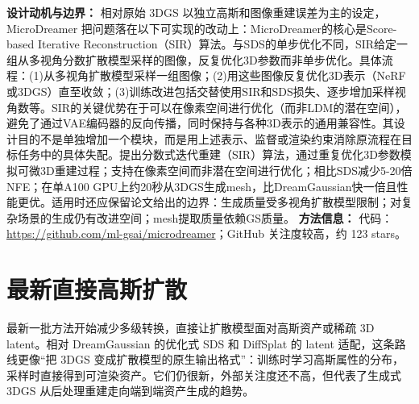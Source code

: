 \textbf{设计动机与边界：} 相对原始 3DGS 以独立高斯和图像重建误差为主的设定，MicroDreamer 把问题落在以下可实现的改动上：MicroDreamer的核心是Score-based Iterative Reconstruction（SIR）算法。与SDS的单步优化不同，SIR给定一组从多视角分数扩散模型采样的图像，反复优化3D参数而非单步优化。具体流程：(1)从多视角扩散模型采样一组图像；(2)用这些图像反复优化3D表示（NeRF或3DGS）直至收敛；(3)训练改进包括交替使用SIR和SDS损失、逐步增加采样视角数等。SIR的关键优势在于可以在像素空间进行优化（而非LDM的潜在空间），避免了通过VAE编码器的反向传播，同时保持与各种3D表示的通用兼容性。其设计目的不是单独增加一个模块，而是用上述表示、监督或渲染约束消除原流程在目标任务中的具体失配。提出分数式迭代重建（SIR）算法，通过重复优化3D参数模拟可微3D重建过程；支持在像素空间而非潜在空间进行优化；相比SDS减少5-20倍NFE；在单A100 GPU上约20秒从3DGS生成mesh，比DreamGaussian快一倍且性能更优。适用时还应保留论文给出的边界：生成质量受多视角扩散模型限制；对复杂场景的生成仍有改进空间；mesh提取质量依赖GS质量。
\textbf{方法信息：} 代码：\url{https://github.com/ml-gsai/microdreamer}；GitHub 关注度较高，约 123 stars。
\section{最新直接高斯扩散}

最新一批方法开始减少多级转换，直接让扩散模型面对高斯资产或稀疏 3D latent。相对 DreamGaussian 的优化式 SDS 和 DiffSplat 的 latent 适配，这条路线更像“把 3DGS 变成扩散模型的原生输出格式”：训练时学习高斯属性的分布，采样时直接得到可渲染资产。它们仍很新，外部关注度还不高，但代表了生成式 3DGS 从后处理重建走向端到端资产生成的趋势。



